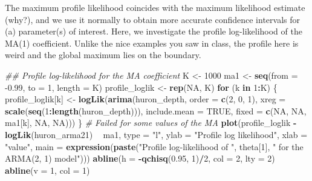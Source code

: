 \documentclass[]{book}
\newenvironment{Shaded}{\begin{snugshade}}{\end{snugshade}}
\newcommand{\CommentTok}[1]{\textcolor[rgb]{0.56,0.35,0.01}{\textit{#1}}}
\newcommand{\ControlFlowTok}[1]{\textcolor[rgb]{0.13,0.29,0.53}{\textbf{#1}}}
\newcommand{\DataTypeTok}[1]{\textcolor[rgb]{0.13,0.29,0.53}{#1}}
\newcommand{\DecValTok}[1]{\textcolor[rgb]{0.00,0.00,0.81}{#1}}
\newcommand{\FloatTok}[1]{\textcolor[rgb]{0.00,0.00,0.81}{#1}}
\newcommand{\KeywordTok}[1]{\textcolor[rgb]{0.13,0.29,0.53}{\textbf{#1}}}
\newcommand{\NormalTok}[1]{#1}
\newcommand{\OperatorTok}[1]{\textcolor[rgb]{0.81,0.36,0.00}{\textbf{#1}}}
\newcommand{\OtherTok}[1]{\textcolor[rgb]{0.56,0.35,0.01}{#1}}
\newcommand{\StringTok}[1]{\textcolor[rgb]{0.31,0.60,0.02}{#1}}
\begin{document}
The maximum profile likelihood coincides with the maximum likelihood estimate (why?), and we use it normally to obtain more accurate confidence intervals for (a) parameter(s) of interest. Here, we investigate the profile log-likelihood of the MA(1) coefficient. Unlike the nice examples you saw in class, the profile here is weird and the global maximum lies on the boundary.

\begin{Shaded}
\begin{Highlighting}[]
\CommentTok{## Profile log-likelihood for the MA coefficient}
\NormalTok{K <-}\StringTok{ }\DecValTok{1000}
\NormalTok{ma1 <-}\StringTok{ }\KeywordTok{seq}\NormalTok{(}\DataTypeTok{from =} \FloatTok{-0.99}\NormalTok{, }\DataTypeTok{to =} \DecValTok{1}\NormalTok{, }\DataTypeTok{length =}\NormalTok{ K)}
\NormalTok{profile_loglik <-}\StringTok{ }\KeywordTok{rep}\NormalTok{(}\OtherTok{NA}\NormalTok{, K)}
\ControlFlowTok{for}\NormalTok{ (k }\ControlFlowTok{in} \DecValTok{1}\OperatorTok{:}\NormalTok{K) \{}
\NormalTok{    profile_loglik[k] <-}\StringTok{ }\KeywordTok{logLik}\NormalTok{(}\KeywordTok{arima}\NormalTok{(huron_depth, }\DataTypeTok{order =} \KeywordTok{c}\NormalTok{(}\DecValTok{2}\NormalTok{, }\DecValTok{0}\NormalTok{, }\DecValTok{1}\NormalTok{), }\DataTypeTok{xreg =} \KeywordTok{scale}\NormalTok{(}\KeywordTok{seq}\NormalTok{(}\DecValTok{1}\OperatorTok{:}\KeywordTok{length}\NormalTok{(huron_depth))), }
        \DataTypeTok{include.mean =} \OtherTok{TRUE}\NormalTok{, }\DataTypeTok{fixed =} \KeywordTok{c}\NormalTok{(}\OtherTok{NA}\NormalTok{, }\OtherTok{NA}\NormalTok{, ma1[k], }\OtherTok{NA}\NormalTok{, }\OtherTok{NA}\NormalTok{)))}
\NormalTok{\}}
\CommentTok{# Failed for some values of the MA}
\KeywordTok{plot}\NormalTok{(profile_loglik }\OperatorTok{-}\StringTok{ }\KeywordTok{logLik}\NormalTok{(huron_arma21) }\OperatorTok{~}\StringTok{ }\NormalTok{ma1, }\DataTypeTok{type =} \StringTok{"l"}\NormalTok{, }\DataTypeTok{ylab =} \StringTok{"Profile log likelihood"}\NormalTok{, }
    \DataTypeTok{xlab =} \StringTok{"value"}\NormalTok{, }\DataTypeTok{main =} \KeywordTok{expression}\NormalTok{(}\KeywordTok{paste}\NormalTok{(}\StringTok{"Profile log-likelihood of "}\NormalTok{, theta[}\DecValTok{1}\NormalTok{], }
        \StringTok{" for the ARMA(2, 1) model"}\NormalTok{)))}
\KeywordTok{abline}\NormalTok{(}\DataTypeTok{h =} \OperatorTok{-}\KeywordTok{qchisq}\NormalTok{(}\FloatTok{0.95}\NormalTok{, }\DecValTok{1}\NormalTok{)}\OperatorTok{/}\DecValTok{2}\NormalTok{, }\DataTypeTok{col =} \DecValTok{2}\NormalTok{, }\DataTypeTok{lty =} \DecValTok{2}\NormalTok{)}
\KeywordTok{abline}\NormalTok{(}\DataTypeTok{v =} \DecValTok{1}\NormalTok{, }\DataTypeTok{col =} \DecValTok{1}\NormalTok{)}
\end{Highlighting}
\end{Shaded}
\end{document}
